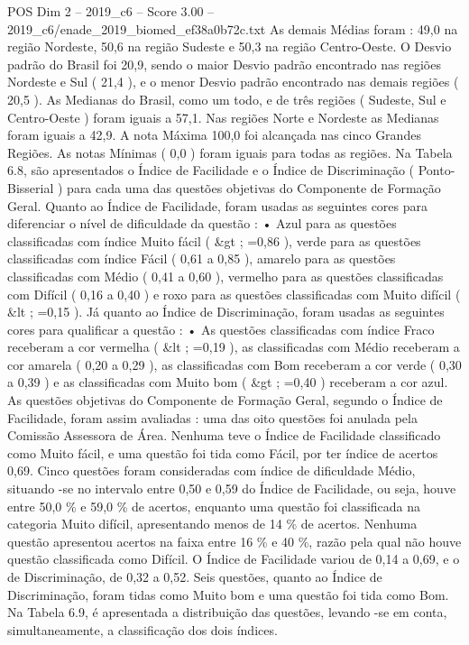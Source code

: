 \begin{textsample}{POS Dim 2 – 2019\_c6 – Score 3.00 – 2019\_c6/enade\_2019\_biomed\_ef38a0b72c.txt}
As demais Médias foram : 49,0 na região Nordeste, 50,6 na região Sudeste e 50,3 na região Centro-Oeste.
O Desvio padrão do Brasil foi 20,9, sendo o maior Desvio padrão encontrado nas regiões Nordeste e Sul ( 21,4 ), e o menor Desvio padrão encontrado nas demais regiões ( 20,5 ).
As Medianas do Brasil, como um todo, e de três regiões ( Sudeste, Sul e Centro-Oeste ) foram iguais a 57,1.
Nas regiões Norte e Nordeste as Medianas foram iguais a 42,9.
A nota Máxima 100,0 foi alcançada nas cinco Grandes Regiões.
As notas Mínimas ( 0,0 ) foram iguais para todas as regiões.
Na Tabela 6.8, são apresentados o Índice de Facilidade e o Índice de Discriminação ( Ponto-Bisserial ) para cada uma das questões objetivas do Componente de Formação Geral.
Quanto ao Índice de Facilidade, foram usadas as seguintes cores para diferenciar o nível de dificuldade da questão : • Azul para as questões classificadas com índice Muito fácil ( \&gt ; =0,86 ), verde para as questões classificadas com índice Fácil ( 0,61 a 0,85 ), amarelo para as questões classificadas com Médio ( 0,41 a 0,60 ), vermelho para as questões classificadas com Difícil ( 0,16 a 0,40 ) e roxo para as questões classificadas com Muito difícil ( \&lt ; =0,15 ).
Já quanto ao Índice de Discriminação, foram usadas as seguintes cores para qualificar a questão : • As questões classificadas com índice Fraco receberam a cor vermelha ( \&lt ; =0,19 ), as classificadas com Médio receberam a cor amarela ( 0,20 a 0,29 ), as classificadas com Bom receberam a cor verde ( 0,30 a 0,39 ) e as classificadas com Muito bom ( \&gt ; =0,40 ) receberam a cor azul.
As questões objetivas do Componente de Formação Geral, segundo o Índice de Facilidade, foram assim avaliadas : uma das oito questões foi anulada pela Comissão Assessora de Área.
Nenhuma teve o Índice de Facilidade classificado como Muito fácil, e uma questão foi tida como Fácil, por ter índice de acertos 0,69.
Cinco questões foram consideradas com índice de dificuldade Médio, situando -se no intervalo entre 0,50 e 0,59 do Índice de Facilidade, ou seja, houve entre 50,0 \% e 59,0 \% de acertos, enquanto uma questão foi classificada na categoria Muito difícil, apresentando menos de 14 \% de acertos.
Nenhuma questão apresentou acertos na faixa entre 16 \% e 40 \%, razão pela qual não houve questão classificada como Difícil.
O Índice de Facilidade variou de 0,14 a 0,69, e o de Discriminação, de 0,32 a 0,52.
Seis questões, quanto ao Índice de Discriminação, foram tidas como Muito bom e uma questão foi tida como Bom.
Na Tabela 6.9, é apresentada a distribuição das questões, levando -se em conta, simultaneamente, a classificação dos dois índices.

\end{textsample}
